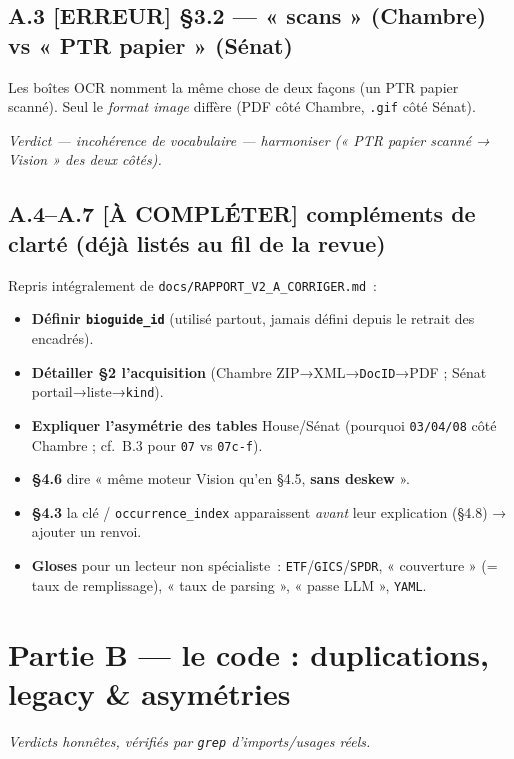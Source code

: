 \documentclass[11pt,a4paper]{article}
\newcommand{\co}[1]{\texttt{\small #1}}
\newcommand{\tagErr}{\textcolor{red!75!black}{\textbf{[ERREUR]}}}
\newcommand{\tagAmel}{\textcolor{orange!90!black}{\textbf{[À COMPLÉTER]}}}
\newcommand{\verdict}[1]{\par\smallskip\noindent{\color{coreC}\rule{2pt}{\baselineskip}}\hspace{6pt}\textit{Verdict — #1}\par\smallskip}
\begin{document}
\subsection{A.3 \;\tagErr{} \;§3.2 — « scans » (Chambre) vs « PTR papier » (Sénat)}
Les boîtes OCR nomment la même chose de deux façons (un PTR papier scanné). Seul le \emph{format image}
diffère (PDF côté Chambre, \co{.gif} côté Sénat). \verdict{incohérence de vocabulaire — harmoniser
(« PTR papier scanné → Vision » des deux côtés).}

\subsection{A.4–A.7 \;\tagAmel{} \;compléments de clarté (déjà listés au fil de la revue)}
Repris intégralement de \co{docs/RAPPORT_V2_A_CORRIGER.md}~:
\begin{itemize}[nosep,leftmargin=1.4em]
\item \textbf{Définir \co{bioguide_id}} (utilisé partout, jamais défini depuis le retrait des encadrés).
\item \textbf{Détailler §2 l'acquisition} (Chambre ZIP→XML→\co{DocID}→PDF ; Sénat portail→liste→\co{kind}).
\item \textbf{Expliquer l'asymétrie des tables} House/Sénat (pourquoi \co{03/04/08} côté Chambre ; cf.~B.3
pour \co{07} vs \co{07c-f}).
\item \textbf{§4.6} dire « même moteur Vision qu'en §4.5, \textbf{sans deskew} ».
\item \textbf{§4.3} la clé / \co{occurrence_index} apparaissent \emph{avant} leur explication (§4.8) →
ajouter un renvoi.
\item \textbf{Gloses} pour un lecteur non spécialiste~: \co{ETF}/\co{GICS}/\co{SPDR}, « couverture »
(= taux de remplissage), « taux de parsing », « passe LLM », \co{YAML}.
\end{itemize}

\section{Partie B — le code : duplications, legacy \& asymétries}
\textit{Verdicts honnêtes, vérifiés par \co{grep} d'imports/usages réels.}
\end{document}
